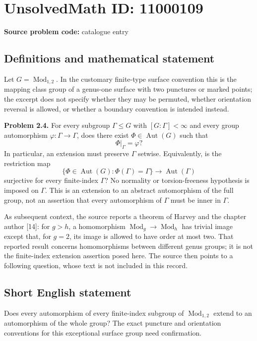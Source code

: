 \documentclass[11pt]{article}
\begin{document}
\section*{UnsolvedMath ID: 11000109}
\textbf{Source problem code:} catalogue entry
\subsection{Definitions and mathematical statement}
Let $G=\operatorname{Mod}_{1,2}$. In the customary finite-type surface convention this is the mapping class group of a genus-one surface with two punctures or marked points; the excerpt does not specify whether they may be permuted, whether orientation reversal is allowed, or whether a boundary convention is intended instead.

\textbf{Problem 2.4.} For every subgroup $\Gamma\le G$ with $[G:\Gamma]<\infty$ and every group automorphism $\varphi:\Gamma\to\Gamma$, does there exist $\Phi\in\operatorname{Aut}(G)$ such that
\[
 \Phi|_{\Gamma}=\varphi?
\]
In particular, an extension must preserve $\Gamma$ setwise. Equivalently, is the restriction map
\[
 \{\Phi\in\operatorname{Aut}(G):\Phi(\Gamma)=\Gamma\}
 \longrightarrow\operatorname{Aut}(\Gamma)
\]
surjective for every finite-index $\Gamma$? No normality or torsion-freeness hypothesis is imposed on $\Gamma$. This is an extension to an abstract automorphism of the full group, not an assertion that every automorphism of $\Gamma$ must be inner in $\Gamma$.

As subsequent context, the source reports a theorem of Harvey and the chapter author [14]: for $g>h$, a homomorphism $\operatorname{Mod}_g\to\operatorname{Mod}_h$ has trivial image except that, for $g=2$, its image is allowed to have order at most two. That reported result concerns homomorphisms between different genus groups; it is not the finite-index extension assertion posed here. The source then points to a following question, whose text is not included in this record.
\subsection{Short English statement}
Does every automorphism of every finite-index subgroup of $\operatorname{Mod}_{1,2}$ extend to an automorphism of the whole group? The exact puncture and orientation conventions for this exceptional surface group need confirmation.
\end{document}
